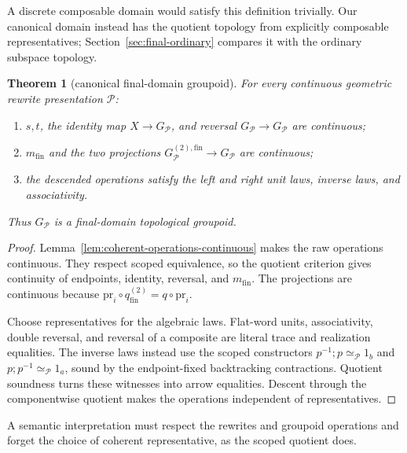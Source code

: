 \documentclass[10pt,reqno]{amsart}
\theoremstyle{definition}
\theoremstyle{plain}
\newtheorem{theorem}[definition]{Theorem}
\theoremstyle{remark}
\newcommand{\RwEq}{\mathrel{\simeq_{\!\mathcal P}}}
\newcommand{\Fin}{\mathrm{fin}}
\begin{document}
A discrete composable domain would satisfy this definition trivially.
Our canonical domain instead has the quotient topology from explicitly
composable representatives; Section~\ref{sec:final-ordinary} compares it with
the ordinary subspace topology.

\begin{theorem}[canonical final-domain groupoid]
\label{thm:final-groupoid}
For every continuous geometric rewrite presentation $\mathcal P$:
\begin{enumerate}[label=(\alph*),leftmargin=2.2em]
\item $s,t$, the identity map $X\to G_{\mathcal P}$, and reversal
  $G_{\mathcal P}\to G_{\mathcal P}$ are continuous;
\item $m_{\Fin}$ and the two projections
  $G_{\mathcal P}^{(2),\Fin}\to G_{\mathcal P}$ are continuous;
\item the descended operations satisfy the left and right unit laws, inverse
  laws, and associativity.
\end{enumerate}
Thus $G_{\mathcal P}$ is a final-domain topological groupoid.
\end{theorem}

\begin{proof}
Lemma~\ref{lem:coherent-operations-continuous} makes the raw operations
continuous. They respect scoped equivalence, so the quotient criterion
gives continuity of endpoints, identity, reversal, and $m_{\Fin}$.
The projections are continuous because
$\mathrm{pr}_i\circ q_{\Fin}^{(2)}=q\circ\mathrm{pr}_i$.

Choose representatives for the algebraic laws. Flat-word units,
associativity, double reversal, and reversal of a composite are literal
trace and realization equalities. The inverse laws instead use the scoped
constructors $p^{-1};p\RwEq 1_b$ and $p;p^{-1}\RwEq 1_a$, sound by the
endpoint-fixed backtracking contractions. Quotient soundness turns these
witnesses into arrow equalities. Descent through the componentwise quotient
makes the operations independent of representatives.
\end{proof}



A semantic interpretation must respect the rewrites and groupoid
operations and forget the choice of coherent representative, as the scoped
quotient does.
\end{document}
